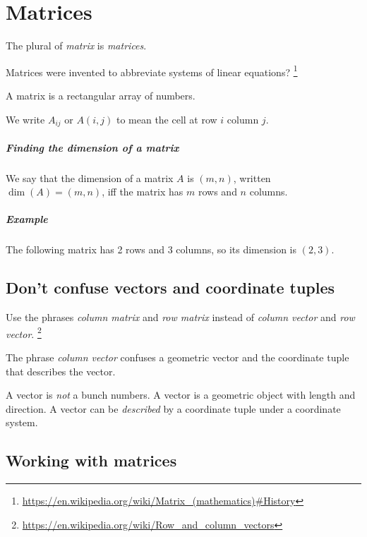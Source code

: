 \chapter{Matrices}

The plural of \emph{matrix} is \emph{matrices}.

Matrices were invented to abbreviate systems of linear equations?%
\footnote{\url{https://en.wikipedia.org/wiki/Matrix_(mathematics)\#History}}

A matrix is a rectangular array of numbers.

We write \(A_{ij}\) or \(A(i,j)\) to mean the cell at row \(i\) column \(j\).

\paragraph{Finding the dimension of a matrix}

We say that the dimension of a matrix \(A\) is \((m,n)\),
written \(\dim(A) = (m,n)\),
iff the matrix has \(m\) rows and \(n\) columns.

\paragraph{Example}
The following matrix has 2 rows and 3 columns, so its dimension is \((2,3)\).

\section*{Don't confuse vectors and coordinate tuples}

Use the phrases \emph{column matrix} and \emph{row matrix}
instead of \emph{column vector} and \emph{row vector}.%
\footnote{\url{https://en.wikipedia.org/wiki/Row_and_column_vectors}}

The phrase \emph{column vector} confuses a geometric vector and
the coordinate tuple that describes the vector.

A vector is \emph{not} a bunch numbers.
A vector is a geometric object with length and direction.
A vector can be \emph{described} by a coordinate tuple under a coordinate system.

\section{Working with matrices}

